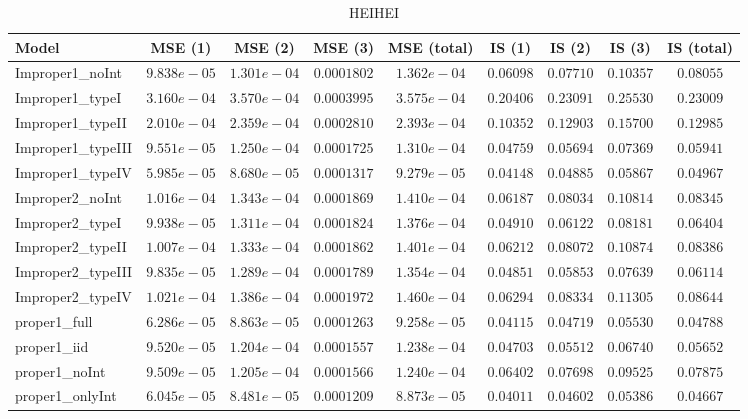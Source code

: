 \begin{table}

\caption{\label{tab:model-choice-sc10}HEIHEI}
\centering
\begin{tabular}{lcccccccc}
\hline
Model  & MSE (1) & MSE (2) & MSE (3) & MSE (total) & IS (1) & IS (2) & IS (3) & \multicolumn{1}{c}{IS (total)} \\ 
\hline
Improper1_noInt  & $9.838e-05$ & $1.301e-04$ & $0.0001802$ & $1.362e-04$ & $0.06098$ & $0.07710$ & $0.10357$ & $0.08055$ \\
Improper1_typeI  & $3.160e-04$ & $3.570e-04$ & $0.0003995$ & $3.575e-04$ & $0.20406$ & $0.23091$ & $0.25530$ & $0.23009$ \\
Improper1_typeII  & $2.010e-04$ & $2.359e-04$ & $0.0002810$ & $2.393e-04$ & $0.10352$ & $0.12903$ & $0.15700$ & $0.12985$ \\
Improper1_typeIII  & $9.551e-05$ & $1.250e-04$ & $0.0001725$ & $1.310e-04$ & $0.04759$ & $0.05694$ & $0.07369$ & $0.05941$ \\
Improper1_typeIV  & $5.985e-05$ & $8.680e-05$ & $0.0001317$ & $9.279e-05$ & $0.04148$ & $0.04885$ & $0.05867$ & $0.04967$ \\
Improper2_noInt  & $1.016e-04$ & $1.343e-04$ & $0.0001869$ & $1.410e-04$ & $0.06187$ & $0.08034$ & $0.10814$ & $0.08345$ \\
Improper2_typeI  & $9.938e-05$ & $1.311e-04$ & $0.0001824$ & $1.376e-04$ & $0.04910$ & $0.06122$ & $0.08181$ & $0.06404$ \\
Improper2_typeII  & $1.007e-04$ & $1.333e-04$ & $0.0001862$ & $1.401e-04$ & $0.06212$ & $0.08072$ & $0.10874$ & $0.08386$ \\
Improper2_typeIII  & $9.835e-05$ & $1.289e-04$ & $0.0001789$ & $1.354e-04$ & $0.04851$ & $0.05853$ & $0.07639$ & $0.06114$ \\
Improper2_typeIV  & $1.021e-04$ & $1.386e-04$ & $0.0001972$ & $1.460e-04$ & $0.06294$ & $0.08334$ & $0.11305$ & $0.08644$ \\
proper1_full  & $6.286e-05$ & $8.863e-05$ & $0.0001263$ & $9.258e-05$ & $0.04115$ & $0.04719$ & $0.05530$ & $0.04788$ \\
proper1_iid  & $9.520e-05$ & $1.204e-04$ & $0.0001557$ & $1.238e-04$ & $0.04703$ & $0.05512$ & $0.06740$ & $0.05652$ \\
proper1_noInt  & $9.509e-05$ & $1.205e-04$ & $0.0001566$ & $1.240e-04$ & $0.06402$ & $0.07698$ & $0.09525$ & $0.07875$ \\
proper1_onlyInt  & $6.045e-05$ & $8.481e-05$ & $0.0001209$ & $8.873e-05$ & $0.04011$ & $0.04602$ & $0.05386$ & $0.04667$ \\

\end{tabular}
\end{table}

